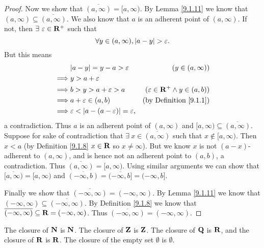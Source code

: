 \begin{proof}
    Now we show that \(\overline{(a, \infty)} = [a, \infty)\).
    By Lemma \ref{9.1.11} we know that \((a, \infty) \subseteq \overline{(a, \infty)}\).
    We also know that \(a\) is an adherent point of \((a, \infty)\).
    If not, then \(\exists\ \varepsilon \in \mathbf{R}^+\) such that
    \[
        \forall y \in (a, \infty), \left\lvert a - y\right\rvert > \varepsilon.
    \]
    But this means
    \begin{align}
                 & \abs{a - y} = y - a > \varepsilon                        & (y \in (a, \infty))                       \\
        \implies & y > a + \varepsilon                                                                                  \\
        \implies & b > y > a + \varepsilon > a                              & (\varepsilon \in \R^+ \land y \in (a, b)) \\
        \implies & a + \varepsilon \in (a, b)                               & \text{(by Definition \ref{9.1.1})}        \\
        \implies & \varepsilon < \abs{a - (a - \varepsilon)} = \varepsilon,
    \end{align}
    a contradiction.
    Thus \(a\) is an adherent point of \((a, \infty)\) and \([a, \infty) \subseteq \overline{(a, \infty)}\).
    Suppose for sake of contradiction that \(\exists\ x \in \overline{(a, \infty)}\) such that \(x \notin [a, \infty)\).
    Then \(x < a\) (by Definition \ref{9.1.8} \(x \in \mathbf{R}\) so \(x \neq \infty\)).
    But we know \(x\) is not \((a - x)\)-adherent to \((a, \infty)\), and is hence not an adherent point to \((a, b)\), a contradiction.
    Thus \(\overline{(a, \infty)} = [a, \infty)\).
    Using similar arguments we can show that \(\overline{[a, \infty)} = [a, \infty)\) and \(\overline{(-\infty, b)} = \overline{(-\infty, b]} = (-\infty, b]\).

    Finally we show that \(\overline{(-\infty, \infty)} = (-\infty, \infty)\).
    By Lemma \ref{9.1.11} we know that \((-\infty, \infty) \subseteq \overline{(-\infty, \infty)}\).
    By Definition \ref{9.1.8} we know that \(\overline{(-\infty, \infty)} \subseteq \mathbf{R} = (-\infty, \infty)\).
    Thus \(\overline{(-\infty, \infty)} = (-\infty, \infty)\).
\end{proof}

\begin{lemma}\label{9.1.13}
    The closure of \(\mathbf{N}\) is \(\mathbf{N}\).
    The closure of \(\mathbf{Z}\) is \(\mathbf{Z}\).
    The closure of \(\mathbf{Q}\) is \(\mathbf{R}\), and the closure of \(\mathbf{R}\) is \(\mathbf{R}\).
    The closure of the empty set \(\emptyset\) is \(\emptyset\).
\end{lemma}

